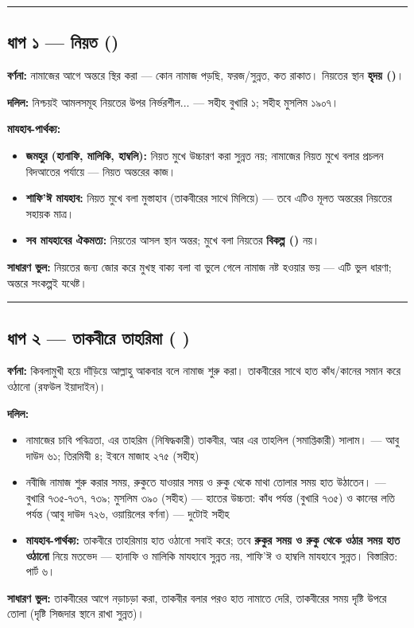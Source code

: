\medskip\hrule\medskip

\subsection*{ধাপ ১ — নিয়ত ()}

\textbf{বর্ণনা:} নামাজের আগে অন্তরে স্থির করা — কোন নামাজ পড়ছি, ফরজ/সুন্নত, কত রাকাত। নিয়তের স্থান \textbf{হৃদয় ()}।

\textbf{দলিল:} নিশ্চয়ই আমলসমূহ নিয়তের উপর নির্ভরশীল... — সহীহ বুখারি ১; সহীহ মুসলিম ১৯০৭।

\textbf{মাযহাব-পার্থক্য:}
\begin{itemize}
\item \textbf{জমহুর (হানাফি, মালিকি, হাম্বলি):} নিয়ত মুখে উচ্চারণ করা সুন্নত নয়; নামাজের নিয়ত মুখে বলার প্রচলন বিদআতের পর্যায়ে — নিয়ত অন্তরের কাজ।
\item \textbf{শাফি'ঈ মাযহাব:} নিয়ত মুখে বলা মুস্তাহাব (তাকবীরের সাথে মিলিয়ে) — তবে এটিও মূলত অন্তরের নিয়তের সহায়ক মাত্র।
\item \textbf{সব মাযহাবের ঐকমত্য:} নিয়তের আসল স্থান অন্তর; মুখে বলা নিয়তের \textbf{বিকল্প ()} নয়।
\end{itemize}
\textbf{সাধারণ ভুল:} নিয়তের জন্য জোর করে মুখস্থ বাক্য বলা বা ভুলে গেলে নামাজ নষ্ট হওয়ার ভয় — এটি ভুল ধারণা; অন্তরে সংকল্পই যথেষ্ট।

\medskip\hrule\medskip

\subsection*{ধাপ ২ — তাকবীরে তাহরিমা ( )}

\textbf{বর্ণনা:} কিবলামুখী হয়ে দাঁড়িয়ে আল্লাহু আকবার বলে নামাজ শুরু করা। তাকবীরের সাথে হাত কাঁধ/কানের সমান করে ওঠানো (রফউল ইয়াদাইন)।

\textbf{দলিল:}
\begin{itemize}
\item {}নামাজের চাবি পবিত্রতা, এর তাহরিম (নিষিদ্ধকারী) তাকবীর, আর এর তাহলিল (সমাপ্তিকারী) সালাম। — আবু দাউদ ৬১; তিরমিযী ৪; ইবনে মাজাহ ২৭৫ (সহীহ)
\item {}নবীজি নামাজ শুরু করার সময়, রুকুতে যাওয়ার সময় ও রুকু থেকে মাথা তোলার সময় হাত উঠাতেন। — বুখারি ৭৩৫-৭৩৭, ৭৩৯; মুসলিম ৩৯০ (সহীহ) — হাতের উচ্চতা: কাঁধ পর্যন্ত (বুখারি ৭৩৫) ও কানের লতি পর্যন্ত (আবু দাউদ ৭২৬, ওয়ায়িলের বর্ণনা) — দুটোই সহীহ
\item \textbf{মাযহাব-পার্থক্য:} তাকবীরে তাহরিমায় হাত ওঠানো সবাই করে; তবে \textbf{রুকুর সময় ও রুকু থেকে ওঠার সময় হাত ওঠানো} নিয়ে মতভেদ — হানাফি ও মালিকি মাযহাবে সুন্নত নয়, শাফি'ঈ ও হাম্বলি মাযহাবে সুন্নত। বিস্তারিত: পার্ট ৬।
\end{itemize}
\textbf{সাধারণ ভুল:} তাকবীরের আগে নড়াচড়া করা, তাকবীর বলার পরও হাত নামাতে দেরি, তাকবীরের সময় দৃষ্টি উপরে তোলা (দৃষ্টি সিজদার স্থানে রাখা সুন্নত)।


